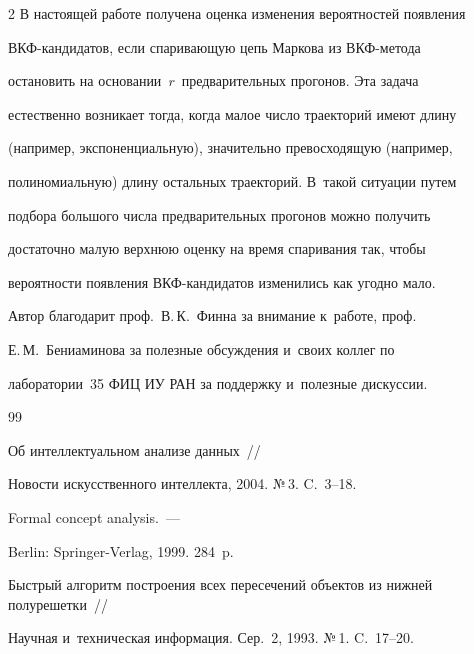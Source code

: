 \begin{multicols}{2}
    В настоящей работе получена оценка изменения вероятностей появления 

ВКФ-кандидатов, если спаривающую цепь Маркова из ВКФ-метода 

остановить на основании~$r$~предварительных прогонов. Эта задача 

естественно возникает тогда, когда малое число траекторий имеют длину 

(например, экспоненциальную), значительно превосходящую (например, 

полиномиальную) длину остальных траекторий. В~такой ситуации путем 

подбора большого числа предварительных прогонов можно получить 

достаточно малую верхнюю оценку на время спаривания так, чтобы 

вероятности появления ВКФ-кан\-ди\-да\-тов изменились как угодно мало.

    

    \bigskip

    

    Автор благодарит проф.\ В.\,К.~Финна за внимание к~работе, проф.\ 

Е.\,М.~Бениаминова за полезные обсуждения и~своих коллег по 

лаборатории~35 ФИЦ ИУ РАН за поддержку и~полезные дискуссии.

    

{\small\frenchspacing

 {%


 \begin{thebibliography}{99}


 Об интеллектуальном анализе данных~// 

Новости искусственного интеллекта, 2004. №\,3. C.~3--18.


 Formal concept analysis.~--- 

Berlin: Springer-Verlag, 1999. 284~p.



Быстрый алгоритм построения всех пересечений объектов из нижней полурешетки~// 

Научная и~техническая информация. Сер.~2, 1993. №\,1. C.~17--20.


\end{thebibliography}}}
\end{multicols}
